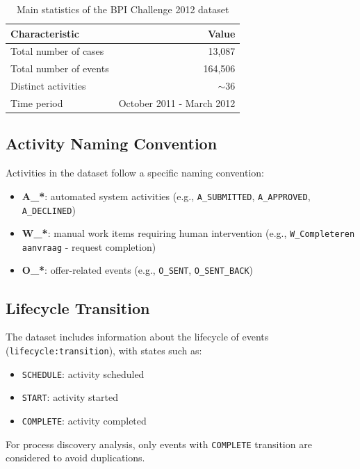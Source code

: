 \documentclass[a4paper,twoside,12pt]{article}
\begin{document}
\begin{table}[H]
\centering
\begin{tabular}{lr}
\toprule
\textbf{Characteristic} & \textbf{Value} \\
\midrule
Total number of cases & 13,087 \\
Total number of events & 164,506 \\
Distinct activities & $\sim$36 \\
Time period & October 2011 - March 2012 \\
\bottomrule
\end{tabular}
\caption{Main statistics of the BPI Challenge 2012 dataset}
\label{tab:dataset_stats}
\end{table}

\subsection{Activity Naming Convention}

Activities in the dataset follow a specific naming convention:

\begin{itemize}
    \item \textbf{A\_*}: automated system activities (e.g., \texttt{A\_SUBMITTED}, \texttt{A\_APPROVED}, \texttt{A\_DECLINED})
    \item \textbf{W\_*}: manual work items requiring human intervention (e.g., \texttt{W\_Completeren aanvraag} - request completion)
    \item \textbf{O\_*}: offer-related events (e.g., \texttt{O\_SENT}, \texttt{O\_SENT\_BACK})
\end{itemize}

\subsection{Lifecycle Transition}

The dataset includes information about the lifecycle of events (\texttt{lifecycle:transition}), with states such as:
\begin{itemize}
    \item \texttt{SCHEDULE}: activity scheduled
    \item \texttt{START}: activity started
    \item \texttt{COMPLETE}: activity completed
\end{itemize}

For process discovery analysis, only events with \texttt{COMPLETE} transition are considered to avoid duplications.
\end{document}
